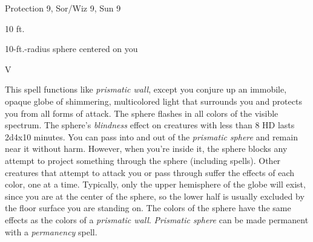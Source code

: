 
\begin{description*}
\item[Level:] Protection 9, Sor/Wiz 9, Sun 9
\item[Range:] 10 ft.
\item[Effect:] 10-ft.-radius sphere centered on you
\item[Components:] V
\end{description*}

This spell functions like \textit{prismatic wall}, except you conjure up an immobile,
opaque globe of shimmering, multicolored light that surrounds you and protects
you from all forms of attack. The sphere flashes in all colors of the visible spectrum.
The sphere's \textit{blindness} effect on creatures with less than 8 HD lasts 2d4x10
minutes.
You can pass into and out of the \textit{prismatic sphere} and remain near it without
harm. However, when you're inside it, the sphere blocks any attempt to project
something through the sphere (including spells). Other creatures that attempt to
attack you or pass through suffer the effects of each color, one at a time.
Typically, only the upper hemisphere of the globe will exist, since you are at
the center of the sphere, so the lower half is usually excluded by the floor surface
you are standing on.
The colors of the sphere have the same effects as the colors of a \textit{prismatic
wall}.
\textit{Prismatic sphere} can be made permanent with a \textit{permanency} spell.